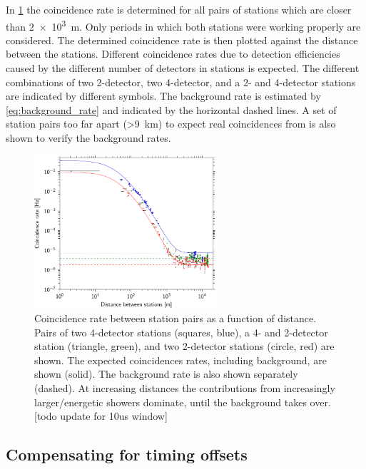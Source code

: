 In \cref{fig:distance_v_coincidence_rate} the coincidence rate is determined for all pairs of stations which are closer than \SI{2e3}{\meter}. Only periods in which both stations were working properly are considered. The determined coincidence rate is then plotted against the distance between the stations. Different coincidence rates due to detection efficiencies caused by the different number of detectors in stations is expected. The different combinations of two 2-detector, two 4-detector, and a 2- and 4-detector stations are indicated by different symbols. The background rate is estimated by \cref{eq:background_rate} and indicated by the horizontal dashed lines. A set of station pairs too far apart (\SI{>9}{\kilo\meter}) to expect real coincidences from is also shown to verify the background rates.

\begin{figure}
    \centering
    \includegraphics[width=0.6\textwidth]
                    {plots/cluster/distance_v_coincidence_rate}
    \caption{Coincidence rate between station pairs as a function of distance. Pairs of two 4-detector stations (squares, blue), a 4- and 2-detector station (triangle, green), and two 2-detector stations (circle, red) are shown. The expected coincidences rates, including background, are shown (solid). The background rate is also shown separately (dashed). At increasing distances the contributions from increasingly larger/energetic showers dominate, until the background takes over. [todo update for 10us window]}
    \label{fig:distance_v_coincidence_rate}
\end{figure}


\subsection{Compensating for \gps timing offsets}
\label{ssec:compensating_gps_offset}

